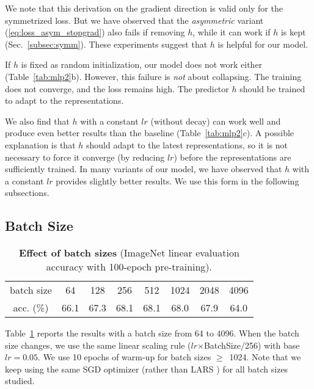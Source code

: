 \documentclass[final]{cvpr}
\newcommand{\tablestyle}[2]{\setlength{\tabcolsep}{#1}\renewcommand{\arraystretch}{#2}\centering\footnotesize}
\begin{document}
We note that this derivation on the gradient direction is valid only for the symmetrized loss. But we have observed that the \emph{asymmetric} variant (\ref{eq:loss_asym_stopgrad}) also fails if removing $h$,  while it can work if $h$ is kept (Sec.~\ref{subsec:symm}).
These experiments suggest that $h$ is helpful for our model.

If $h$ is fixed as random initialization, our model does not work either (Table~\ref{tab:mlp2}b).
However, this failure is \emph{not} about collapsing. 
The training does not converge, and the loss remains high.
The predictor $h$ should be trained to adapt to the representations. 

We also find that $h$ with a constant $lr$ (without decay) can work well and produce even better results than the baseline (Table~\ref{tab:mlp2}c). A possible explanation is that $h$ should adapt to the latest representations, so it is not necessary to force it converge (by reducing $lr$) before the representations are sufficiently trained. In many variants of our model, we have observed that $h$ with a constant $lr$ provides slightly better results. We use this form in the following subsections.

\subsection{Batch Size} \label{subsec:batch}
 
\begin{table}[t]
\centering
\small
\tablestyle{6pt}{1.1}
\begin{tabular}{c|ccccccc}
batch size & 64 & 128 & 256 & 512 & 1024 & 2048 & 4096 \\
\shline
acc. (\%) & 66.1 & 67.3 & 68.1 & 68.1 & 68.0 & 67.9 & 64.0 \\ 
\end{tabular}
\vspace{.5em}
\caption{\textbf{Effect of batch sizes} (ImageNet linear evaluation accuracy with 100-epoch pre-training).
\label{tab:batch}
}
\end{table}


Table~\ref{tab:batch} reports the results with a batch size from 64 to 4096. When the batch size changes, we use the same linear scaling rule ($lr$$\times$BatchSize/256) \cite{Goyal2017} with base $lr\!=\!0.05$.
We use 10 epochs of warm-up \cite{Goyal2017} for batch sizes $\geq\!$~1024. Note that we keep using the same SGD optimizer (rather than LARS \cite{You2017}) for all batch sizes studied.
\end{document}
